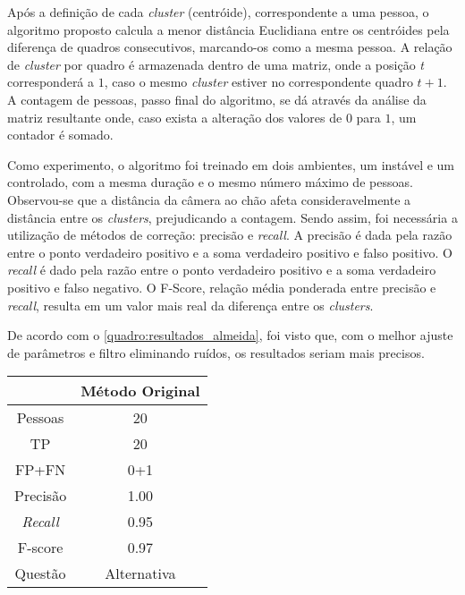 \documentclass[12pt,oneside,a4paper,chapter=TITLE,section=TITLE,sumario=tradicional]{abntex2}
\begin{document}
\begin{figure}[htb]
\end{figure}

Após a definição de cada \textit{cluster} (centróide), correspondente a uma pessoa, o algoritmo proposto calcula a menor distância Euclidiana entre os centróides pela diferença de quadros consecutivos, marcando-os como a mesma pessoa.
A relação de \textit{cluster} por quadro é armazenada dentro de uma matriz, onde a posição \textit{t} corresponderá a $1$, caso o mesmo \textit{cluster} estiver no correspondente quadro $t+1$. A contagem de pessoas, passo final do algoritmo, se dá através da análise da matriz resultante onde, caso exista a alteração dos valores de $0$ para $1$, um contador é somado.

Como experimento, o algoritmo foi treinado em dois ambientes, um instável e um controlado, com a mesma duração e o mesmo número máximo de pessoas. Observou-se que a distância da câmera ao chão afeta consideravelmente a distância entre os \textit{clusters}, prejudicando a contagem. Sendo assim, foi necessária a utilização de métodos de correção: precisão e \textit{recall}. A precisão é dada pela razão entre o ponto verdadeiro positivo e a soma verdadeiro positivo e falso positivo. O \textit{recall} é dado pela razão entre o ponto verdadeiro positivo e a soma verdadeiro positivo e falso negativo. O F-Score, relação média ponderada entre precisão e \textit{recall}, resulta em um valor mais real da diferença entre os \textit{clusters}.

De acordo com o \autoref{quadro:resultados_almeida}, foi visto que, com o melhor ajuste de parâmetros e filtro eliminando ruídos, os resultados seriam mais precisos.

\begin{quadro}[htb]
    \begin{tabular}{|c|c|}
        \hline
        \textbf{} & \textbf{Método Original}\\ 
        \hline\hline
        Pessoas & 20\\ \hline
        TP  & 20\\ \hline
        FP+FN    & 0+1\\ \hline
        Precisão  & 1.00\\ \hline
        \textit{Recall}  & 0.95\\ \hline
        F-score & 0.97\\ \hline
        Questão & Alternativa\\ \hline
    \end{tabular}
    
\end{quadro}
\end{document}
